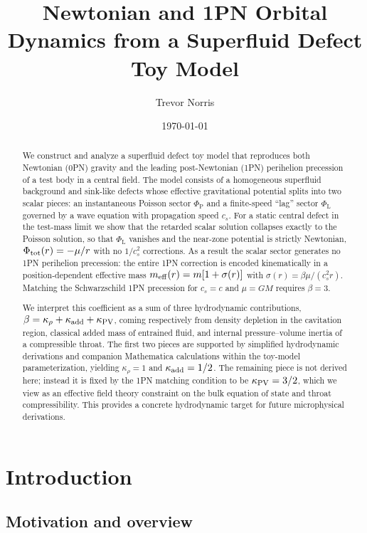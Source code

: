 \documentclass[11pt]{article}
\title{Newtonian and 1PN Orbital Dynamics from a Superfluid Defect Toy Model}
\author{Trevor Norris}
\date{\today}
\newcommand{\cS}{c_s}
\newcommand{\PhiP}{\Phi_{\mathrm{P}}}
\newcommand{\PhiL}{\Phi_{\mathrm{L}}}
\begin{document}
\maketitle

\begin{abstract}
We construct and analyze a superfluid defect toy model that reproduces both Newtonian (0PN) gravity and the leading post-Newtonian (1PN) perihelion precession of a test body in a central field. The model consists of a homogeneous superfluid background and sink-like defects whose effective gravitational potential splits into two scalar pieces: an instantaneous Poisson sector $\PhiP$ and a finite-speed ``lag'' sector $\PhiL$ governed by a wave equation with propagation speed $\cS$. For a static central defect in the test-mass limit we show that the retarded scalar solution collapses exactly to the Poisson solution, so that $\PhiL$ vanishes and the near-zone potential is strictly Newtonian, $\Phi_{\rm tot}(r) = -\mu/r$ with no $1/\cS^2$ corrections. As a result the scalar sector generates no 1PN perihelion precession: the entire 1PN correction is encoded kinematically in a position-dependent effective mass $m_{\rm eff}(r) = m[1 + \sigma(r)]$ with $\sigma(r) = \beta \mu/(\cS^2 r)$. Matching the Schwarzschild 1PN precession for $\cS = c$ and $\mu = GM$ requires $\beta = 3$.

We interpret this coefficient as a sum of three hydrodynamic contributions, $\beta = \kappa_\rho + \kappa_{\rm add} + \kappa_{\rm PV}$, coming respectively from density depletion in the cavitation region, classical added mass of entrained fluid, and internal pressure--volume inertia of a compressible throat. The first two pieces are supported by simplified hydrodynamic derivations and companion Mathematica calculations within the toy-model parameterization, yielding $\kappa_\rho = 1$ and $\kappa_{\rm add} = 1/2$. The remaining piece is not derived here; instead it is fixed by the 1PN matching condition to be $\kappa_{\rm PV} = 3/2$, which we view as an effective field theory constraint on the bulk equation of state and throat compressibility. This provides a concrete hydrodynamic target for future microphysical derivations.
\end{abstract}

\section{Introduction}
\label{sec:intro}

\subsection{Motivation and overview}
\end{document}
